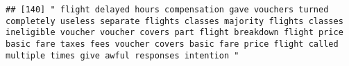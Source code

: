 \documentclass[
]{article}
\begin{document}
\begin{verbatim}
## [140] " flight delayed hours compensation gave vouchers turned completely useless separate flights classes majority flights classes ineligible voucher voucher covers part flight breakdown flight price basic fare taxes fees voucher covers basic fare price flight called multiple times give awful responses intention "                                                                                                                                                                                                                                                                                                                                                                                                                                                                                                                                                                                                                                                                                                                                                                                                                                                                                                                                                                                                                                                                                                                                                                                                                                                                                                                                                                                                                                                                          

\end{verbatim}
\end{document}
